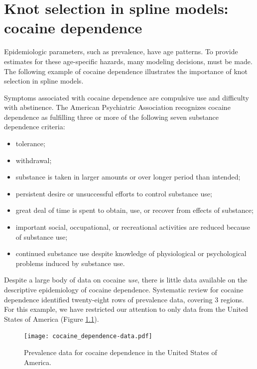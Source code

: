 \chapter{Knot selection in spline models: cocaine dependence}
\label{applications-splines_knot_loc}

Epidemiologic parameters, such as prevalence, have age patterns.  To provide
estimates for these age-specific hazards, many modeling decisions, must be made.
The following example of cocaine dependence illustrates the importance of
knot selection in spline models.

Symptoms associated with cocaine dependence are compulsive use and
difficulty with abstinence.  The American Psychiatric Association
recognizes cocaine dependence as fulfilling three or more of the
following seven substance dependence criteria: \cite{american_diagnostic_2000, wagner_first_2002}
    \begin{itemize} \label{page:app-substance_dependence}
        \item tolerance;
        \item withdrawal;
        \item substance is taken in larger amounts or over longer
          period than intended;
        \item persistent desire or unsuccessful efforts to control
          substance use;
        \item great deal of time is spent to obtain, use, or recover
          from effects of substance;
        \item important social, occupational, or recreational
          activities are reduced because of substance use;
        \item continued substance use despite knowledge of
          physiological or psychological problems induced by substance
          use.
    \end{itemize}

Despite a large body of data on cocaine \emph{use}, there is little
data available on the descriptive epidemiology of cocaine
dependence.\cite{Degenhardt_GBDrugs_2011} Systematic review for cocaine
dependence identified twenty-eight rows of prevalence data,
covering 3 regions.  For this example, we have restricted our attention
to only data from the United States of America (Figure \ref{fig:app-cocaine_data}).

    \begin{figure}[h]
        \begin{center}
            \texttt{[image: cocaine\_dependence-data.pdf]}
            \caption{Prevalence data for cocaine dependence in the United States of America.}
            \label{fig:app-cocaine_data}
        \end{center}
    \end{figure}

